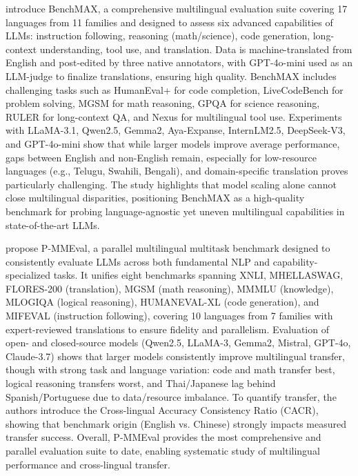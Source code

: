 \documentclass[acmsmall]{acmart}
\begin{document}
\citep{huang2025benchmaxcomprehensivemultilingualevaluation} introduce BenchMAX, a comprehensive multilingual evaluation suite covering 17 languages from 11 families and designed to assess six advanced capabilities of LLMs: instruction following, reasoning (math/science), code generation, long-context understanding, tool use, and translation. Data is machine-translated from English and post-edited by three native annotators, with GPT-4o-mini used as an LLM-judge to finalize translations, ensuring high quality. BenchMAX includes challenging tasks such as HumanEval+ for code completion, LiveCodeBench for problem solving, MGSM for math reasoning, GPQA for science reasoning, RULER for long-context QA, and Nexus for multilingual tool use. Experiments with LLaMA-3.1, Qwen2.5, Gemma2, Aya-Expanse, InternLM2.5, DeepSeek-V3, and GPT-4o-mini show that while larger models improve average performance, gaps between English and non-English remain, especially for low-resource languages (e.g., Telugu, Swahili, Bengali), and domain-specific translation proves particularly challenging. The study highlights that model scaling alone cannot close multilingual disparities, positioning BenchMAX as a high-quality benchmark for probing language-agnostic yet uneven multilingual capabilities in state-of-the-art LLMs.

\citep{zhang2025pmmevalparallelmultilingualmultitask} propose P-MMEval, a parallel multilingual multitask benchmark designed to consistently evaluate LLMs across both fundamental NLP and capability-specialized tasks. It unifies eight benchmarks spanning XNLI, MHELLASWAG, FLORES-200 (translation), MGSM (math reasoning), MMMLU (knowledge), MLOGIQA (logical reasoning), HUMANEVAL-XL (code generation), and MIFEVAL (instruction following), covering 10 languages from 7 families with expert-reviewed translations to ensure fidelity and parallelism. Evaluation of open- and closed-source models (Qwen2.5, LLaMA-3, Gemma2, Mistral, GPT-4o, Claude-3.7) shows that larger models consistently improve multilingual transfer, though with strong task and language variation: code and math transfer best, logical reasoning transfers worst, and Thai/Japanese lag behind Spanish/Portuguese due to data/resource imbalance. To quantify transfer, the authors introduce the Cross-lingual Accuracy Consistency Ratio (CACR), showing that benchmark origin (English vs. Chinese) strongly impacts measured transfer success. Overall, P-MMEval provides the most comprehensive and parallel evaluation suite to date, enabling systematic study of multilingual performance and cross-lingual transfer.
\end{document}
